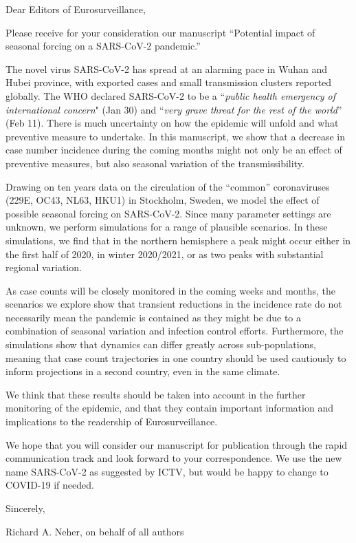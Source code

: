 \documentclass[rmp, eprint, superscriptaddress,floatfix]{revtex4-1}
\begin{document}
Dear Editors of Eurosurveillance,

Please receive for your consideration our manuscript “Potential impact of seasonal forcing on a SARS-CoV-2 pandemic.” 

The novel virus SARS-CoV-2 has spread at an alarming pace in Wuhan and Hubei province, with exported cases and small transmission clusters reported globally. The WHO declared SARS-CoV-2 to be a ``\textit{public health emergency of international concern}" (Jan 30) and ``\textit{very grave threat for the rest of the world}” (Feb 11). There is much uncertainty on how the epidemic will unfold and what preventive measure to undertake. In this manuscript, we show that a decrease in case number incidence during the coming months might not only be an effect of preventive measures, but also seasonal variation of the transmissibility.

Drawing on ten years data on the circulation of the “common” coronaviruses (229E, OC43, NL63, HKU1) in Stockholm, Sweden, we model the effect of possible seasonal forcing on SARS-CoV-2. Since many parameter settings are unknown, we perform simulations for a range of plausible scenarios. In these simulations, we find that in the northern hemisphere a peak might occur either in the first half of 2020, in winter 2020/2021, or as two peaks with substantial regional variation.

As case counts will be closely monitored in the coming weeks and months, the scenarios we explore show that transient reductions in the incidence rate do not necessarily mean the pandemic is contained as they might be due to a combination of seasonal variation and infection control efforts. Furthermore, the simulations show that dynamics can differ greatly across sub-populations, meaning that case count trajectories in one country should be used cautiously to inform projections in a second country, even in the same climate. 

We think that these results should be taken into account in the further monitoring of the epidemic, and that they contain important information and implications to the readership of Eurosurveillance. 

We hope that you will consider our manuscript for publication through the rapid communication track and look forward to
your correspondence. We use the new name SARS-CoV-2 as suggested by ICTV, but would be happy to change to COVID-19 if needed.

Sincerely,

Richard A. Neher, on behalf of all authors
\end{document}

